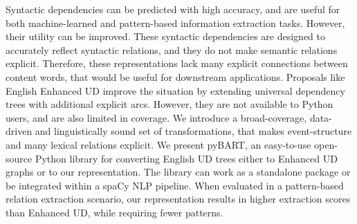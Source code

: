 Syntactic dependencies can be predicted with high accuracy, and are useful for both machine-learned and pattern-based information extraction tasks. However, their utility can be improved. These syntactic dependencies are designed to accurately reflect syntactic relations, and they do not make semantic relations explicit. Therefore, these representations lack many explicit connections between content words, that would be useful for downstream applications. Proposals like English Enhanced UD improve the situation by extending universal dependency trees with additional explicit arcs. However, they are not available to Python users, and are also limited in coverage. We introduce a broad-coverage, data-driven and linguistically sound set of transformations, that makes event-structure and many lexical relations explicit. We present pyBART, an easy-to-use open-source Python library for converting English UD trees either to Enhanced UD graphs or to our representation. The library can work as a standalone package or be integrated within a spaCy NLP pipeline. When evaluated in a pattern-based relation extraction scenario, our representation results in higher extraction scores than Enhanced UD, while requiring fewer patterns.

